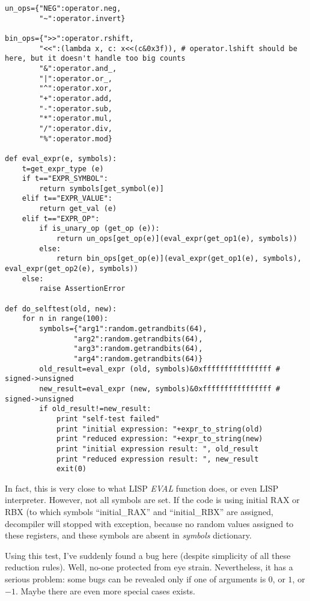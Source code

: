 ﻿\documentclass[12pt]{article}
\begin{document}
\begin{lstlisting}
un_ops={"NEG":operator.neg,
        "~":operator.invert}

bin_ops={">>":operator.rshift,
        "<<":(lambda x, c: x<<(c&0x3f)), # operator.lshift should be here, but it doesn't handle too big counts
        "&":operator.and_,
        "|":operator.or_,
        "^":operator.xor,
        "+":operator.add,
        "-":operator.sub,
        "*":operator.mul,
        "/":operator.div,
        "%":operator.mod}

def eval_expr(e, symbols):
    t=get_expr_type (e)
    if t=="EXPR_SYMBOL":
        return symbols[get_symbol(e)]
    elif t=="EXPR_VALUE":
        return get_val (e)
    elif t=="EXPR_OP":
        if is_unary_op (get_op (e)):
            return un_ops[get_op(e)](eval_expr(get_op1(e), symbols))
        else:
            return bin_ops[get_op(e)](eval_expr(get_op1(e), symbols), eval_expr(get_op2(e), symbols))
    else:
        raise AssertionError

def do_selftest(old, new):
    for n in range(100):
        symbols={"arg1":random.getrandbits(64), 
                "arg2":random.getrandbits(64), 
                "arg3":random.getrandbits(64), 
                "arg4":random.getrandbits(64)}
        old_result=eval_expr (old, symbols)&0xffffffffffffffff # signed->unsigned
        new_result=eval_expr (new, symbols)&0xffffffffffffffff # signed->unsigned
        if old_result!=new_result:
            print "self-test failed"
            print "initial expression: "+expr_to_string(old)
            print "reduced expression: "+expr_to_string(new)
            print "initial expression result: ", old_result
            print "reduced expression result: ", new_result
            exit(0)
\end{lstlisting}

In fact, this is very close to what LISP \textit{EVAL} function does, or even LISP interpreter.
However, not all symbols are set.
If the code is using initial RAX or RBX (to which symbols ``initial\_RAX'' and ``initial\_RBX'' are assigned,
decompiler will stopped with exception, because no random values assigned to these registers,
and these symbols are absent in \textit{symbols} dictionary.

Using this test, I've suddenly found a bug here (despite simplicity of all these reduction rules).
Well, no-one protected from eye strain.
Nevertheless, it has a serious problem: some bugs can be revealed only if one of arguments is $0$, or $1$, or $-1$.
Maybe there are even more special cases exists.
\end{document}
